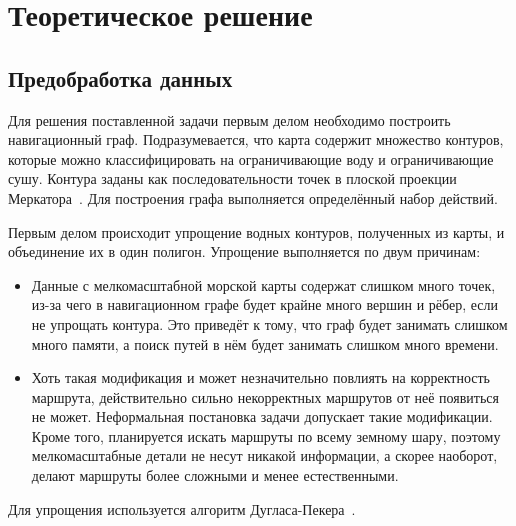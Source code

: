 \chapter{Теоретическое решение}

\label{ch:theoretical-solution}

\section{Предобработка данных}

\label{sec:preprocessing}

Для решения поставленной задачи первым делом необходимо построить
навигационный граф. Подразумевается, что карта содержит множество
контуров, которые можно классифицировать на ограничивающие воду и
ограничивающие сушу. Контура заданы как последовательности точек в
плоской проекции Меркатора~\cite{thomas1952conformal}. Для построения
графа выполняется определённый набор действий.

Первым делом происходит упрощение водных контуров, полученных из
карты, и объединение их в один полигон. Упрощение выполняется по двум
причинам:
\begin{itemize}
    \item Данные с мелкомасштабной морской карты содержат слишком много
      точек, из-за чего в навигационном графе будет крайне много вершин и
      рёбер, если не упрощать контура. Это приведёт к тому, что граф будет
      занимать слишком много памяти, а поиск путей в нём будет занимать
      слишком много времени.
    \item Хоть такая модификация и может незначительно повлиять на
      корректность маршрута, действительно сильно некорректных
      маршрутов от неё появиться не может. Неформальная постановка
      задачи допускает такие модификации. Кроме того, планируется
      искать маршруты по всему земному шару, поэтому мелкомасштабные
      детали не несут никакой информации, а скорее наоборот, делают
      маршруты более сложными и менее естественными.
\end{itemize}
Для упрощения используется алгоритм Дугласа-Пекера~\cite{douglas1973algorithms}.


